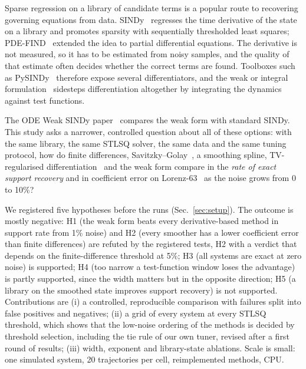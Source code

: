 Sparse regression on a library of candidate terms is a popular route to recovering governing equations from data. SINDy~\cite{brunton2015discovering} regresses the time derivative of the state on a library and promotes sparsity with sequentially thresholded least squares; PDE-FIND~\cite{rudy2016data} extended the idea to partial differential equations. The derivative is not measured, so it has to be estimated from noisy samples, and the quality of that estimate often decides whether the correct terms are found. Toolboxes such as PySINDy~\cite{silva2020pysindy} therefore expose several differentiators, and the weak or integral formulation~\cite{schaeffer2017sparse,messenger2021weak,messenger2020weak,reinbold2020using} sidesteps differentiation altogether by integrating the dynamics against test functions.

The ODE Weak SINDy paper~\cite{messenger2021weak} compares the weak form with standard SINDy. This study asks a narrower, controlled question about all of these options: with the same library, the same STLSQ solver, the same data and the same tuning protocol, how do finite differences, Savitzky--Golay~\cite{savitzky1964smoothing}, a smoothing spline, TV-regularised differentiation~\cite{chartrand2011numerical} and the weak form compare in the \emph{rate of exact support recovery} and in coefficient error on Lorenz-63~\cite{lorenz1963deterministic} as the noise grows from 0 to 10\%?

We registered five hypotheses before the runs (Sec.~\ref{sec:setup}). The outcome is mostly negative: H1 (the weak form beats every derivative-based method in support rate from 1\% noise) and H2 (every smoother has a lower coefficient error than finite differences) are refuted by the registered tests, H2 with a verdict that depends on the finite-difference threshold at 5\%; H3 (all systems are exact at zero noise) is supported; H4 (too narrow a test-function window loses the advantage) is partly supported, since the width matters but in the opposite direction; H5 (a library on the smoothed state improves support recovery) is not supported. Contributions are (i) a controlled, reproducible comparison with failures split into false positives and negatives; (ii) a grid of every system at every STLSQ threshold, which shows that the low-noise ordering of the methods is decided by threshold selection, including the tie rule of our own tuner, revised after a first round of results; (iii) width, exponent and library-state ablations. Scale is small: one simulated system, 20 trajectories per cell, reimplemented methods, CPU.
